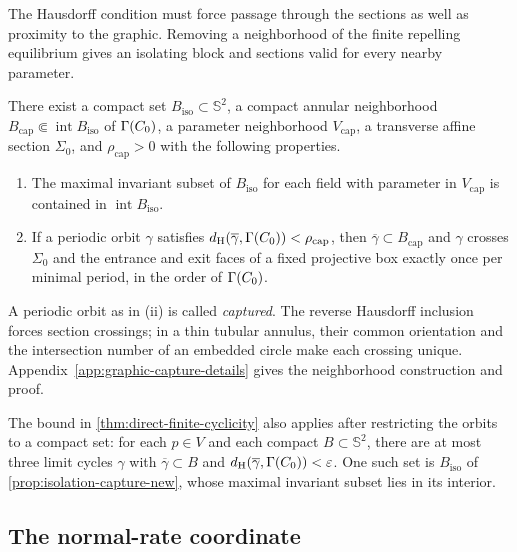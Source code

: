 The Hausdorff condition must force passage through the sections as well
as proximity to the graphic. Removing a neighborhood of the finite
repelling equilibrium gives an isolating block and sections valid for
every nearby parameter.

\begin{proposition}
\label{prop:isolation-capture-new}
There exist a compact set $B_{\mathrm{iso}}\subset\mathbb S^2$, a compact annular
neighborhood $B_{\mathrm{cap}}\Subset\operatorname{int}B_{\mathrm{iso}}$ of $\Gamma(C_0)$,
a parameter neighborhood $V_{\mathrm{cap}}$, a transverse affine section $\Sigma_0$,
and $\rho_{\mathrm{cap}}>0$ with the following properties.

\begin{enumerate}[label=\textup{(\roman*)}]
\item The maximal invariant subset of $B_{\mathrm{iso}}$ for each field with parameter in
  $V_{\mathrm{cap}}$ is contained in $\operatorname{int}B_{\mathrm{iso}}$.
\item If a periodic orbit $\gamma$ satisfies
  $d_{\mathrm H}(\overline\gamma,\Gamma(C_0))<\rho_{\mathrm{cap}}$, then
  $\overline\gamma\subset B_{\mathrm{cap}}$ and $\gamma$ crosses
  $\Sigma_0$ and the entrance and exit faces of a fixed projective box
  exactly once per minimal period, in the order of $\Gamma(C_0)$.
\end{enumerate}
\end{proposition}

A periodic orbit as in (ii) is called \emph{captured}. The reverse
Hausdorff inclusion forces section crossings; in a thin tubular annulus,
their common orientation and the intersection number of an embedded
circle make each crossing unique. Appendix~\ref{app:graphic-capture-details}
gives the neighborhood construction and proof.

\begin{remark}
\label{rem:cyclicity-formulation}
The bound in \cref{thm:direct-finite-cyclicity} also applies after
restricting the orbits to a compact set: for each \(p\in V\) and each
compact \(B\subset\mathbb S^2\), there are at most three limit cycles
\(\gamma\) with \(\overline\gamma\subset B\) and
\(d_{\mathrm H}(\overline\gamma,\Gamma(C_0))<\varepsilon\).
One such set is \(B_{\mathrm{iso}}\) of
\cref{prop:isolation-capture-new}, whose maximal invariant subset lies
in its interior.
\end{remark}

\subsection{The normal-rate coordinate}

